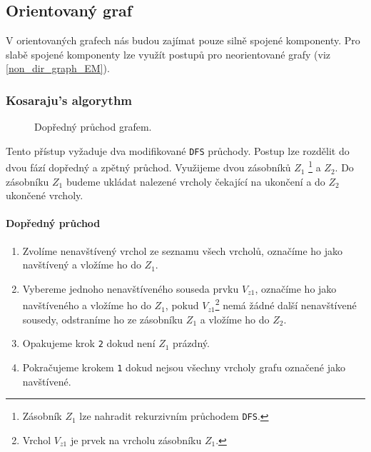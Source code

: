 \documentclass[12pt]{article}
\begin{document}
\subsection{Orientovaný graf}
V orientovaných grafech nás budou zajímat pouze silně spojené komponenty. Pro slabě spojené komponenty lze využít postupů pro neorientované grafy (viz \ref{non_dir_graph_EM}).

\subsubsection{Kosaraju's algorythm\cite{Kosaraju}}
\label{Kosaraju}
\begin{figure}
\vspace{-1cm}
\caption{Dopředný průchod grafem.}
\label{forward_kosara}
\end{figure}

Tento přístup vyžaduje dva modifikované \texttt{DFS} průchody. Postup lze rozdělit do dvou fází dopředný a zpětný průchod. Využijeme dvou zásobníků $Z_1$
\footnote{
Zásobník $Z_1$ lze nahradit rekurzivním průchodem \texttt{DFS}.
} a $Z_2$. Do zásobníku $Z_1$ budeme ukládat nalezené vrcholy čekající na ukončení a do $Z_2$ ukončené vrcholy. 





\pagebreak
\paragraph{Dopředný průchod}

\begin{enumerate}
\setlength\itemsep{1px}
\item Zvolíme nenavštívený vrchol ze seznamu všech vrcholů, označíme ho jako navštívený a vložíme ho do $Z_1$.
\item Vybereme jednoho nenavštíveného souseda prvku $V_{z1}$, označíme ho jako navštíveného a vložíme ho do $Z_1$, pokud $V_{z1}$\footnote{
Vrchol $V_{z1}$ je prvek na vrcholu zásobníku $Z_1$.
}
nemá žádné další nenavštívené sousedy, odstraníme ho ze zásobníku $Z_1$ a vložíme ho do $Z_2$.
\item Opakujeme krok \texttt{2} dokud není $Z_1$ prázdný.
\item Pokračujeme krokem \texttt{1} dokud nejsou všechny vrcholy grafu označené jako navštívené.
\end{enumerate}
\end{document}
